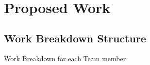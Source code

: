 \documentclass{wrcecapstone}
\begin{document}
\section{Proposed Work}

\subsection{Work Breakdown Structure}
\begin{table}
\caption{Work Breakdown for each Team member}
\end{table}

\end{document}
